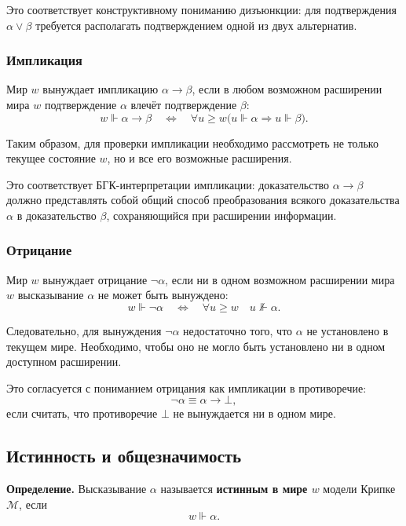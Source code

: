 \documentclass[12pt,a4paper,oneside,openany]{book}
\theoremstyle{definition}
\theoremstyle{plain}
\theoremstyle{remark}
\begin{document}
Это соответствует конструктивному пониманию дизъюнкции: для
подтверждения \(\alpha\lor\beta\) требуется располагать
подтверждением одной из двух альтернатив.

\subsubsection{Импликация}

Мир \(w\) вынуждает импликацию \(\alpha\to\beta\), если в любом
возможном расширении мира \(w\) подтверждение \(\alpha\) влечёт
подтверждение \(\beta\):
\[
w\Vdash\alpha\to\beta
\quad\Longleftrightarrow\quad
\forall u\geqslant w
\bigl(
    u\Vdash\alpha
    \Longrightarrow
    u\Vdash\beta
\bigr).
\]

Таким образом, для проверки импликации необходимо рассмотреть не
только текущее состояние \(w\), но и все его возможные расширения.

Это соответствует БГК-интерпретации импликации: доказательство
\(\alpha\to\beta\) должно представлять собой общий способ
преобразования всякого доказательства \(\alpha\) в доказательство
\(\beta\), сохраняющийся при расширении информации.

\subsubsection{Отрицание}

Мир \(w\) вынуждает отрицание \(\neg\alpha\), если ни в одном
возможном расширении мира \(w\) высказывание \(\alpha\) не может быть
вынуждено:
\[
w\Vdash\neg\alpha
\quad\Longleftrightarrow\quad
\forall u\geqslant w
\quad
u\nVdash\alpha.
\]

Следовательно, для вынуждения \(\neg\alpha\) недостаточно того, что
\(\alpha\) не установлено в текущем мире. Необходимо, чтобы оно не
могло быть установлено ни в одном доступном расширении.

Это согласуется с пониманием отрицания как импликации в
противоречие:
\[
\neg\alpha\equiv\alpha\to\bot,
\]
если считать, что противоречие \(\bot\) не вынуждается ни в одном
мире.


\subsection{Истинность и общезначимость}

\textbf{Определение.}
Высказывание \(\alpha\) называется \textbf{истинным в мире \(w\)}
модели Крипке \(\mathcal M\), если
\[
w\Vdash\alpha.
\]
\end{document}
